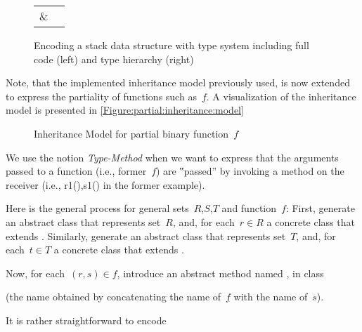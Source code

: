 \begin{figure}[h]
    \caption{Encoding a stack data structure with
    \Java type system including full code (left) and type hierarchy (right)}\label{Figure:stack:encoding} 
    \begin{tabular}{cc}
         \parbox[c]{0.74\linewidth}{
      }
        &
         \parbox[c]{\hsize}{
          
        }
    \end{tabular}
\end{figure}
      Note, that the implemented inheritance model previously used, is now extended to express the partiality
        of functions such as~$f$. A visualization of the inheritance model is presented in \cref{Figure:partial:inheritance:model}

\begin{figure}[ht]
  \label{Figure:partial:inheritence:model}
  \caption{Inheritance Model for partial binary function~$f$}
  \begin{adjustbox}{max width=0.6\linewidth}
    
  \end{adjustbox}
\end{figure}

We use the notion \emph{Type-Method} when we want to express that the arguments passed to a function
  (i.e., former~$f$) are ‟passed” by invoking a method on the receiver (i.e., r1(),s1() in the former example).

Here is the general process for general sets~$R$,$S$,$T$ and function~$f$:
First, generate an abstract class  that represents set~$R$, and,
  for each~$r∈R$ a concrete class  that extends .
Similarly, generate an abstract class  that represents set~$T$, and,
  for each~$t∈T$ a concrete class  that extends .

Now, for each~$(r,s)∈f$, introduce an abstract method named ,
  in class~

(the name obtained by
  concatenating the name of~$f$ with the name of~$s$).

It is rather straightforward to encode
